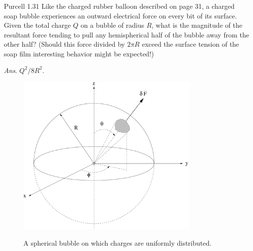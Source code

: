 \documentclass{esg8022pset}
\begin{document}
\begin{problem}{Purcell 1.31}
  Like the charged rubber balloon described on page 31, a charged soap bubble experiences an outward electrical force on every bit of its surface. Given the total charge $Q$ on a bubble of radius $R$, what is the magnitude of the resultant force tending to pull any hemispherical half of the bubble away from the other half? (Should this force divided by $2\pi R$ exceed the surface tension of the soap film interesting behavior might be expected!)

  \begin{flushright}\emph{Ans}. $Q^2/8R^2$.\end{flushright}
\end{problem}
\begin{solution}
  
  \begin{figure}[ht]
    \begin{center}
      \includegraphics[width=9cm]{ps02_sol_03}
      \label{fig:bubble1}
      \caption{A spherical bubble on which charges are uniformly distributed.}
    \end{center}
  \end{figure}


\end{solution}
\end{document}
